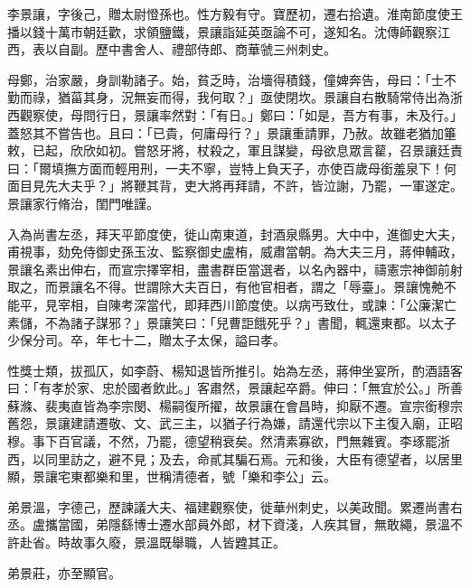 \begin{pinyinscope}
 李景讓，字後己，贈太尉憕孫也。性方毅有守。寶歷初，遷右拾遺。淮南節度使王播以錢十萬市朝廷歡，求領鹽鐵，景讓詣延英亟論不可，遂知名。沈傳師觀察江西，表以自副。歷中書舍人、禮部侍郎、商華虢三州刺史。



 母鄭，治家嚴，身訓勒諸子。始，貧乏時，治墻得積錢，僮婢奔告，母曰：「士不勤而祿，猶菑其身，況無妄而得，我何取？」亟使閉坎。景讓自右散騎常侍出為浙西觀察使，母問行日，景讓率然對：「有日。」鄭曰：「如是，吾方有事，未及行。」蓋怒其不嘗告也。且曰：「已貴，何庸母行？」景讓重請罪，乃赦。故雖老猶加箠敕，已起，欣欣如初。嘗怒牙將，杖殺之，軍且謀變，母欲息眾言雚，召景讓廷責曰：「爾填撫方面而輕用刑，一夫不寧，豈特上負天子，亦使百歲母銜羞泉下！何面目見先大夫乎？」將鞭其背，吏大將再拜請，不許，皆泣謝，乃罷，一軍遂定。景讓家行脩治，閨門唯謹。



 入為尚書左丞，拜天平節度使，徙山南東道，封酒泉縣男。大中中，進御史大夫，甫視事，劾免侍御史孫玉汝、監察御史盧栯，威肅當朝。為大夫三月，蔣伸輔政，景讓名素出伸右，而宣宗擇宰相，盡書群臣當選者，以名內器中，禱憲宗神御前射取之，而景讓名不得。世謂除大夫百日，有他官相者，謂之「辱臺」。景讓愧艴不能平，見宰相，自陳考深當代，即拜西川節度使。以病丐致仕，或諫：「公廉潔亡素儲，不為諸子謀邪？」景讓笑曰：「兒曹詎餓死乎？」書聞，輒還東都。以太子少保分司。卒，年七十二，贈太子太保，謚曰孝。



 性獎士類，拔孤仄，如李蔚、楊知退皆所推引。始為左丞，蔣伸坐宴所，酌酒語客曰：「有孝於家、忠於國者飲此。」客肅然，景讓起卒爵。伸曰：「無宜於公。」所善蘇滌、裴夷直皆為李宗閔、楊嗣復所擢，故景讓在會昌時，抑厭不遷。宣宗銜穆宗舊怨，景讓建請遷敬、文、武三主，以猶子行為嫌，請還代宗以下主復入廟，正昭穆。事下百官議，不然，乃罷，德望稍衰矣。然清素寡欲，門無雜賓。李琢罷浙西，以同里訪之，避不見；及去，命貳其騙石焉。元和後，大臣有德望者，以居里顯，景讓宅東都樂和里，世稱清德者，號「樂和李公」云。



 弟景溫，字德己，歷諫議大夫、福建觀察使，徙華州刺史，以美政聞。累遷尚書右丞。盧攜當國，弟隱繇博士遷水部員外郎，材下資淺，人疾其冒，無敢繩，景溫不許赴省。時故事久廢，景溫既舉職，人皆韙其正。



 弟景莊，亦至顯官。



\end{pinyinscope}